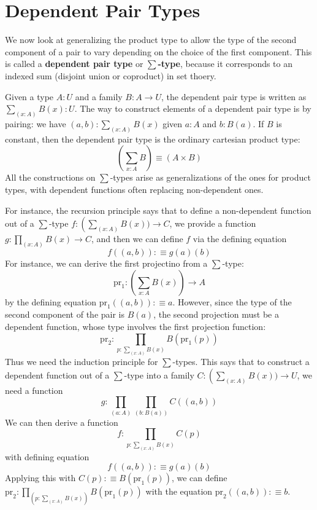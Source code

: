 \section{Dependent Pair Types}

We now look at generalizing the product type to allow the type of the second component of a pair to vary depending on the choice of the first component. This is called a \textbf{dependent pair type} or \textbf{$\sum$-type}, because it corresponds to an indexed sum (disjoint union or coproduct) in set thoery.

Given a type $A:U$ and a family $B:A\rightarrow U$, the dependent pair type is written as $\sum_{(x:A)}B(x):U$. The way to construct elements of a dependent pair type is by pairing: we have $(a,b) : \sum_{(x:A)}B(x)$ given $a :A$ and $b:B(a)$. If $B$ is constant, then the dependent pair type is the ordinary cartesian product type: $$\left(\sum_{x:A}B\right) \equiv (A\times B)$$
All the constructions on $\sum$-types arise as generalizations of the ones for product types, with dependent functions often replacing non-dependent ones.

For instance, the recursion principle says that to define a non-dependent function out of a $\sum$-type $f:\left(\sum_{(x:A)}B(x))\rightarrow C$, we provide a function $g:\prod_{(x:A)}B(x)\rightarrow C$, and then we can define $f$ via the defining equation $$f((a,b)) :\equiv g(a)(b)$$
For instance, we can derive the first projectino from a $\sum$-type: $$\text{pr}_1:\left(\sum_{x:A}B(x)\right)\rightarrow A$$
by the defining equation $\text{pr}_1((a,b)) :\equiv a$. However, since the type of the second component of the pair is $B(a)$, the second projection must be a dependent function, whose type involves the first projection function: $$\text{pr}_2:\prod_{p:\sum_{(x:A)}B(x)}B(\text{pr}_1(p))$$
Thus we need the induction principle for $\sum$-types. This says that to construct a dependent function out of a $\sum$-type into a family $C:\left(\sum_{(x:A)}B(x))\rightarrow U$, we need a function $$g:\prod_{(a:A)}\prod_{(b:B(a))}C((a,b))$$
We can then derive a function $$f:\prod_{p:\sum_{(x:A)}B(x)}C(p)$$
with defining equation $$f((a,b)) :\equiv g(a)(b)$$
Applying this with $C(p) :\equiv B(\text{pr}_1(p))$, we can define $\text{pr}_2:\prod_{(p:\sum_{(x:A)}B(x))}B(\text{pr}_1(p))$ with the equation $\text{pr}_2((a,b)) :\equiv b$.


